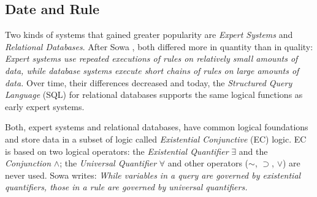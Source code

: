 %
%
%
%
%
%
%

\subsection{Date and Rule}
\label{date_and_rule_heading}

Two kinds of systems that gained greater popularity are \emph{Expert Systems}
and \emph{Relational Databases}. After Sowa \cite{sowa}, both differed more in
quantity than in quality: \textit{Expert systems use repeated executions of
rules on relatively small amounts of data, while database systems execute short
chains of rules on large amounts of data.} Over time, their differences
decreased and today, the \emph{Structured Query Language} (SQL) for relational
databases supports the same logical functions as early expert systems.

Both, expert systems and relational databases, have common logical foundations
and store data in a subset of logic called \emph{Existential Conjunctive} (EC)
logic. EC is based on two logical operators: the \emph{Existential Quantifier}
$\exists$ and the \emph{Conjunction} $\wedge$; the \emph{Universal Quantifier}
$\forall$ and other operators ($\sim$, $\supset$, $\vee$) are never used.
Sowa \cite[p. 163]{sowa} writes: \textit{While variables in a query are governed
by existential quantifiers, those in a rule are governed by universal quantifiers.}

